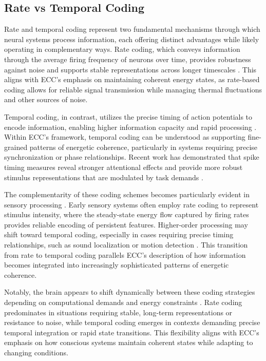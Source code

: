 \begin{refsection}
\subsection{Rate vs Temporal Coding}

Rate and temporal coding represent two fundamental mechanisms through which neural systems process information, each offering distinct advantages while likely operating in complementary ways. Rate coding, which conveys information through the average firing frequency of neurons over time, provides robustness against noise and supports stable representations across longer timescales \cite{kumar2010spiking}. This aligns with ECC's emphasis on maintaining coherent energy states, as rate-based coding allows for reliable signal transmission while managing thermal fluctuations and other sources of noise.

Temporal coding, in contrast, utilizes the precise timing of action potentials to encode information, enabling higher information capacity and rapid processing \cite{panzeri2010sensory}. Within ECC's framework, temporal coding can be understood as supporting fine-grained patterns of energetic coherence, particularly in systems requiring precise synchronization or phase relationships. Recent work has demonstrated that spike timing measures reveal stronger attentional effects and provide more robust stimulus representations that are modulated by task demands \cite{zhang2023adaptive}.

The complementarity of these coding schemes becomes particularly evident in sensory processing \cite{buzsaki2004neuronal}. Early sensory systems often employ rate coding to represent stimulus intensity, where the steady-state energy flow captured by firing rates provides reliable encoding of persistent features. Higher-order processing may shift toward temporal coding, especially in cases requiring precise timing relationships, such as sound localization or motion detection \cite{womelsdorf2007modulation}. This transition from rate to temporal coding parallels ECC's description of how information becomes integrated into increasingly sophisticated patterns of energetic coherence.

Notably, the brain appears to shift dynamically between these coding strategies depending on computational demands and energy constraints \cite{lisman2013theta}. Rate coding predominates in situations requiring stable, long-term representations or resistance to noise, while temporal coding emerges in contexts demanding precise temporal integration or rapid state transitions. This flexibility aligns with ECC's emphasis on how conscious systems maintain coherent states while adapting to changing conditions.


\end{refsection}
